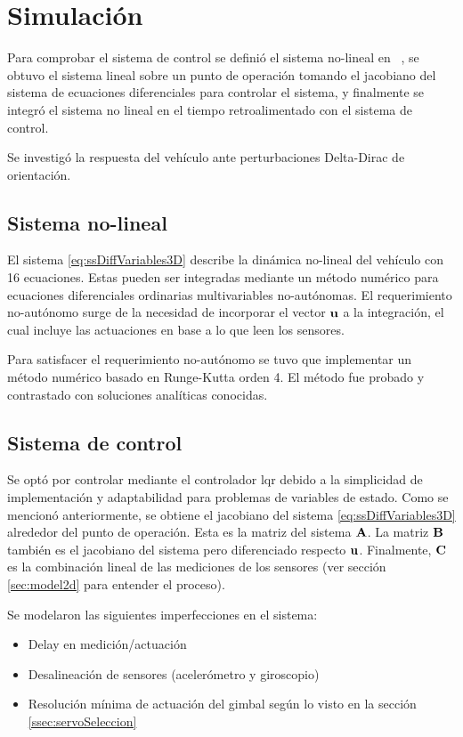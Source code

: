 \section{Simulación}

Para comprobar el sistema de control se definió el sistema no-lineal en \Matlab~, se obtuvo el sistema lineal sobre un punto de operación tomando el jacobiano del sistema de ecuaciones diferenciales para controlar el sistema, y finalmente se integró el sistema no lineal en el tiempo retroalimentado con el sistema de control.

Se investigó la respuesta del vehículo ante perturbaciones Delta-Dirac de orientación.

\subsection{Sistema no-lineal}

El sistema \eqref{eq:ssDiffVariables3D} describe la dinámica no-lineal del vehículo con 16 ecuaciones. Estas pueden ser integradas mediante un método numérico para ecuaciones diferenciales ordinarias multivariables no-autónomas. El requerimiento no-autónomo surge de la necesidad de incorporar el vector $\mathbf{u}$ a la integración, el cual incluye las actuaciones en base a lo que leen los sensores. 

Para satisfacer el requerimiento no-autónomo se tuvo que implementar un método numérico basado en Runge-Kutta orden 4. El método fue probado y contrastado con soluciones analíticas conocidas.

\subsection{Sistema de control}

Se optó por controlar mediante el controlador \gls{lqr} debido a la simplicidad de implementación y adaptabilidad para problemas de variables de estado. Como se mencionó anteriormente, se obtiene el jacobiano del sistema \eqref{eq:ssDiffVariables3D} alrededor del punto de operación. Esta es la matriz del sistema $\mathbf{A}$. La matriz $\mathbf{B}$ también es el jacobiano del sistema pero diferenciado respecto $\mathbf{u}$. Finalmente, $\mathbf{C}$ es la combinación lineal de las mediciones de los sensores (ver sección \ref{sec:model2d} para entender el proceso). 

Se modelaron las siguientes imperfecciones en el sistema:

\begin{itemize}
    \item Delay en medición/actuación
    \item Desalineación de sensores (acelerómetro y giroscopio)
    \item Resolución mínima de actuación del gimbal según lo visto en la sección \ref{ssec:servoSeleccion}
\end{itemize}

